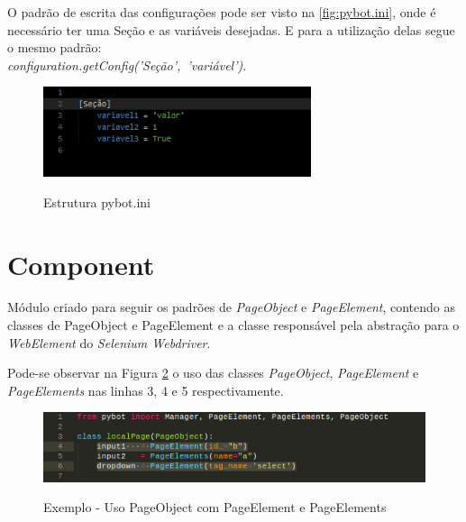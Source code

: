         O padrão de escrita das configurações pode ser visto na \autoref{fig:pybot.ini}, onde é necessário ter uma Seção e as variáveis desejadas.
        E para a utilização delas segue o mesmo padrão: \\ \mbox{\textit{configuration.getConfig('Seção', 'variável')}}.

        \begin{figure}[H]
            \vspace*{0,3cm}
            \centering
            \caption{Estrutura pybot.ini}
            \includegraphics[width=0.7\textwidth]{./04-figuras/ini}
            \label{fig:pybot.ini}
        \end{figure}


    \section{Component} \label{sec:comp}
        Módulo criado para seguir os padrões de \textit{PageObject} e \textit{PageElement}, contendo as classes de PageObject e PageElement e a classe responsável
        pela abstração para o \textit{WebElement} do \textit{Selenium Webdriver}.

        Pode-se observar na Figura \ref{fig:eleme} o uso das classes \textit{PageObject}, \textit{PageElement} e \textit{PageElements} nas linhas 3, 4 e 5 respectivamente.

        \begin{figure}[H]
            \vspace*{0,3cm}
            \centering
            \caption{Exemplo - Uso PageObject com PageElement e PageElements}
            \includegraphics[width=1\textwidth]{./04-figuras/pageElement}
            \label{fig:eleme}
        \end{figure}


